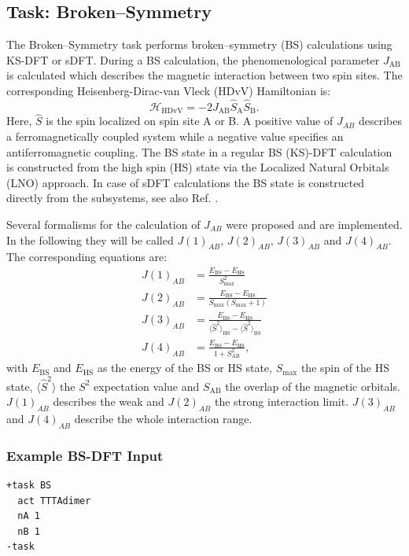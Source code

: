 \documentclass[bibliography=totocnumbered,a4paper,10pt,oneside]{scrbook}
\begin{document}
\subsection{Task: Broken--Symmetry\label{task:brokensymmetry}}
The Broken--Symmetry task performs broken--symmetry (BS) calculations using KS-DFT
or sDFT. During a BS calculation, the phenomenological parameter $J_\text{AB}$ is calculated
which describes the magnetic interaction between two spin sites. The corresponding 
Heisenberg-Dirac-van Vleck (HDvV) Hamiltonian is:
\begin{equation}
	\mathcal{H}_\text{HDvV} = -2J_\text{AB} \hat{S}_\text{A} \hat{S}_\text{B}.
\end{equation}
Here, $\hat{S}$ is the spin localized on spin site A or B. A positive value of $J_{AB}$ describes
a ferromagnetically coupled system while a negative value specifies an antiferromagnetic coupling.
The BS state in a regular BS (KS)-DFT calculation is constructed from the high spin (HS) 
state via the Localized Natural Orbitals (LNO) approach\cite{shoji2014}. In case of sDFT
calculations the BS state is constructed directly from the subsystems, see also Ref. \cite{massolle2020}.

Several formalisms for the calculation of $J_{AB}$ were proposed and are implemented. In the
following they will be called $J(1)_{AB}$\cite{ginsberg1980, noodleman1981, noodleman1986},
$J(2)_{AB}$\cite{bencini1986}, $J(3)_{AB}$\cite{yamaguchi1986, soda2000} and $J(4)_{AB}$\cite{noodleman1981}. The corresponding equations are:
\begin{align}
	J(1)_{AB} &= \frac{E_\text{BS}-E_\text{HS}}{S_\text{max}^2}\\
	J(2)_{AB} &= \frac{E_\text{BS}-E_\text{HS}}{S_\text{max} (S_\text{max} +1)}\\
	J(3)_{AB} &= \frac{E_\text{BS}-E_\text{HS}}{\langle \hat{S}^2\rangle_\text{HS} - \langle \hat{S}^2\rangle_\text{BS}}\\
	J(4)_{AB} &= \frac{E_\text{BS}-E_\text{HS}}{1 + S_\text{AB}^2},
\end{align}
with $E_\text{BS}$ and $E_\text{HS}$ as the energy of the BS or HS state, $S_\text{max}$
the spin of the HS state, $\langle \hat{S}^2\rangle$ the $S^2$ expectation value and $S_\text{AB}$ the overlap
of the magnetic orbitals. $J(1)_{AB}$ describes the weak and $J(2)_{AB}$ the
strong interaction limit. $J(3)_{AB}$ and $J(4)_{AB}$ describe the whole interaction range.

\subsubsection{Example BS-DFT Input}
\begin{lstlisting}
+task BS
  act TTTAdimer
  nA 1
  nB 1
-task
\end{lstlisting}
\end{document}
